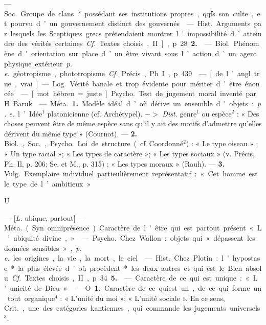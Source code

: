 \begin{itemize}[leftmargin=1cm, label=, itemsep=1pt]
 — \si{Soc.} Groupe de clans* possédant ses institutions propres, qqfs.
son culte, et pourvu d’un gouvernement distinct des gouvernés.

 — \si{Hist.} Arguments par lesquels les Sceptiques grecs prétendaient montrer l'impossibilité d’atteindre des vérités certaines. {\it Cf.}
Textes choisis, II], p. 28 {\bf 2.}

 — \si{Biol.} Phénomène d'orientation sur place d’un être vivant
sous l’action d’un agent physique
extérieur {\it p. e.} géotropisme, phototropisme. {\it Cf.} Précis, Ph. I,
p. 439.

 — [de l’angl. true, vrai] — \si{Log.}
Vérité banale et trop évidente pour
mériter d'être énoncée.

 — [mot hébreu = juste] \si{Psycho.}
Test de jugement moral inventé
par H. Baruk.

 — \si{Méta.} {\bf 1.} Modèle idéal d’où
dérive un ensemble d'objets : {\it p. e.}
l’Idée$^1$ platonicienne (cf. Archétypel). $->$ {\it Dist.} genre$^1$ ou espèce$^2$ :
« Des choses peuvent être de même
espèce sans qu'il y ait des motifs
d'admettre qu'elles dérivent du
même type » (Cournot). — {\bf 2.} \si{Biol.},
\si{Soc.}, \si{Psycho.} Loi de structure (cf.
Coordonné$^2$) : « Le type oiseau » ; « Un
type racial »; « Les types de caractère »; « Les types sociaux » (v. Précis,
Ph. Il, p. 206; Se. et M., p. 315) ;
« Les types moraux » (Rauh). —
 {\bf 3.} \si{Vulg.} Exemplaire individuel partieulièrement représentatif : « Cet
homme est le type de l’ambitieux. »

\begin{center}
U
\end{center}

 — [{\it L.} ubique, partout] — \si{Méta.}
(Syn. omniprésence). Caractère de
l'être qui est partout présent
« L’ubiquité divine, »

 — \si{Psycho.} Chez Wallon :
objets qui « dépassent les données
sensibles », {\it p. e.} les origines, la vie, la
mort, le ciel.

 — \si{Hist.} Chez Plotin : l'hypostase* la plus élevée d’où procèdent*
les deux autres et qui est le Bien
absolu. {\it Cf.} Textes choisis, II, p. 34 {\bf 5.}

 — Caractère de ce qui est
unique : « L’unicité de Dieu. »

 — O {\bf 1.} Caractère de ce quiest un,
de ce qui forme un tout organique$^4$ :
« L'unité du moi »; « L'unité sociale ».
En ce sens, \si{Crit.}, une des catégories
kantiennes, qui commande les jugements universels$^3$.


\end{itemize}
